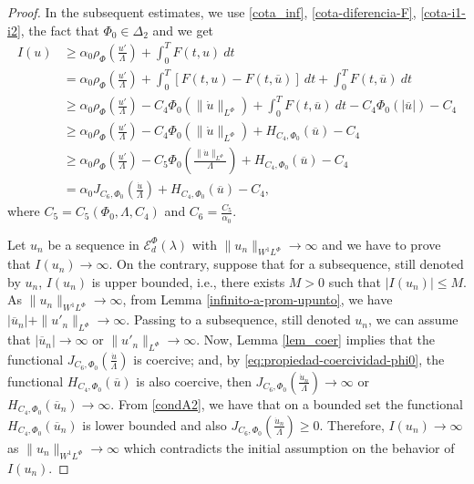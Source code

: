 \documentclass[twoside]{article}
\theoremstyle{remark}
\newcommand{\orlnor}{\|_{L^{\Phi}}}
\newcommand{\lphi}{L^{\Phi}}
\newcommand{\sobnor}{\|_{W^{1}\lphi}}
\newcommand{\domi}{\mathcal{E}^{\Phi}_d(\lambda)}
\renewcommand{\leq}{\leqslant}
\renewcommand{\geq}{\geqslant}
\begin{document}
\begin{proof}
In the subsequent estimates, we use  \eqref{cota_inf}, \eqref{cota-diferencia-F},
\eqref{cota-i1-i2}, the fact that $\Phi_0 \in \Delta_2$ and we get
\begin{equation}\label{cota_inf_I}
\begin{split}
I(u)&\geq\alpha_0\rho_{\Phi}\left( \frac{u'}{\Lambda}\right)+\int_0^TF(t,u)\ dt
\\ 
&=\alpha_0\rho_{\Phi}\left( \frac{u'}{\Lambda}\right)+ \int_0^T \left[F(t,u)-F(t,\overline{u})\right]\ dt
+  \int_0^TF(t,\overline{u})\ dt
\\
&\geq \alpha_0\rho_{\Phi}\left( \frac{u'}{\Lambda}\right)
-C_4 \Phi_0(\|\dot{u}\orlnor)
+\int_0^TF(t,\overline{u})\ dt-
C_4 \Phi_0(|\overline{u}|)-
C_4 
\\
&\geq
\alpha_0\rho_{\Phi}\left( \frac{u'}{\Lambda}\right)
-C_4 \Phi_0(\|\dot{u}\orlnor)
+H_{C_4, \Phi_0}(\overline{u})
-C_4 
\\&\geq
\alpha_0\rho_{\Phi}\left( \frac{u'}{\Lambda}\right)
-C_5 \Phi_0\left(\frac{\|\dot{u}\orlnor}{\Lambda} \right)
+H_{C_4, \Phi_0}(\overline{u})
-C_4 
\\&=
\alpha_0J_{C_6,\Phi_0}\left(\frac{\dot{u}}{\Lambda}\right)
+H_{C_4, \Phi_0}(\overline{u})
-C_4, 
\end{split}
\end{equation}
where $C_5=C_5(\Phi_0,\Lambda,C_4)$ and $C_6=\frac{C_5}{\alpha_0}$.



Let $u_n$ be  a sequence in $\domi$ with
$\|u_n\sobnor\to\infty$ and we have to prove that $I(u_n)\to\infty$.
On the contrary, suppose  that for a subsequence, 
still denoted by $u_n$, $I(u_n)$ is upper bounded, i.e., there exists $M>0$ such that $|I(u_{n})|\leq M$.
As $\|u_n\sobnor\to\infty$, from Lemma \ref{infinito-a-prom-upunto},  we have $|\overline{u}_n|+\|u'_n\orlnor\to \infty$. Passing to a subsequence, still denoted $u_n$, we can assume that $|\overline{u}_n|\to \infty$ or $\|u'_n\orlnor\to \infty$.
Now, Lemma \ref{lem_coer} implies that the functional $J_{C_6,\Phi_0}(\frac{\dot{u}}{\Lambda})$ is coercive;
and, by \eqref{eq:propiedad-coercividad-phi0},
the functional $H_{C_4,\Phi_0}(\overline{u})$ is also coercive, then
$J_{C_6,\Phi_0}(\frac{\dot{u}_n}{\Lambda}) \to \infty$ or $H_{C_4,\Phi_0}(\overline{u}_n)\to \infty$.
From \eqref{condA2}, we have that on a bounded set the functional $H_{C_4,\Phi_0}(\overline{u}_n)$ is lower bounded and also $J_{C_6,\Phi_0}(\frac{\dot{u}_n}{\Lambda})\geq 0$.
Therefore,  $I(u_n)\to\infty$ as $\|u_n\sobnor\to\infty$ which contradicts the initial assumption on the behavior of $I(u_n)$.
\end{proof}
\end{document}
